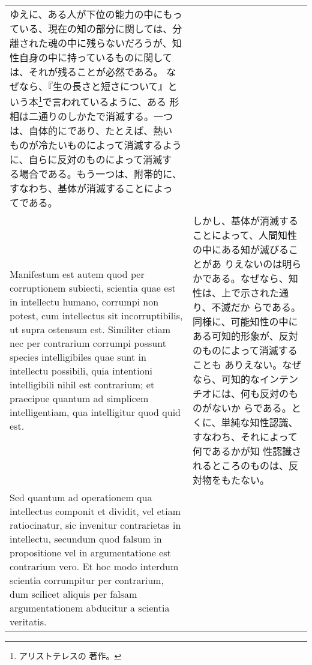 \documentclass[10pt]{jsarticle} %
\begin{document}
\begin{longtable}{p{21em}p{21em}}
ゆえに、ある人が下位の能力の中にもっている、現在の知の部分に関しては、分
 離された魂の中に残らないだろうが、知性自身の中に持っているものに関して
 は、それが残ることが必然である。
なぜなら、『生の長さと短さについて』という本\footnote{アリストテレスの
 著作。}で言われているように、ある
 形相は二通りのしかたで消滅する。一つは、自体的にであり、たとえば、熱い
 ものが冷たいものによって消滅するように、自らに反対のものによって消滅す
 る場合である。もう一つは、附帯的に、すなわち、基体が消滅することによっ
 てである。

\\



Manifestum
est autem quod per corruptionem subiecti, scientia quae est in
intellectu humano, corrumpi non potest, cum intellectus sit
incorruptibilis, ut supra ostensum est. Similiter etiam nec per
contrarium corrumpi possunt species intelligibiles quae sunt in
intellectu possibili, quia intentioni intelligibili nihil est
contrarium; et praecipue quantum ad simplicem intelligentiam, qua
intelligitur quod quid est. 

&

しかし、基体が消滅することによって、人間知性の中にある知が滅びることがあ
 りえないのは明らかである。なぜなら、知性は、上で示された通り、不滅だか
 らである。
同様に、可能知性の中にある可知的形象が、反対のものによって消滅することも
 ありえない。なぜなら、可知的なインテンチオには、何も反対のものがないか
 らである。とくに、単純な知性認識、すなわち、それによって何であるかが知
 性認識されるところのものは、反対物をもたない。

\\

Sed quantum ad operationem qua intellectus
componit et dividit, vel etiam ratiocinatur, sic invenitur contrarietas
in intellectu, secundum quod falsum in propositione vel in
argumentatione est contrarium vero. Et hoc modo interdum scientia
corrumpitur per contrarium, dum scilicet aliquis per falsam
argumentationem abducitur a scientia veritatis. 



\end{longtable}
\end{document}
